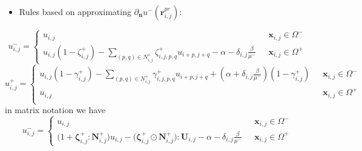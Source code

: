 \documentclass{elsarticle}
\begin{document}
\begin{itemize}
\item Rules based on approximating $\partial_\mathbf{n}u^-(\mathbf{r}^{pr}_{i,j})$:
\end{itemize}
\begin{equation}
 u_{i,j}^-=\begin{cases}
    u_{i,j} & \text{ $\mathbf{x}_{i,j}\in \Omega^-$}\\
    u_{i,j} (1-\zeta^+_{i,j}) - \sum_{(p,q)\in N_{i,j}^+} \zeta_{i,j,p,q}^+ u_{i+p,j+q} - \alpha - \delta_{i,j}\frac{\beta}{\mu^-} & \text{ $\mathbf{x}_{i,j}\in \Omega^+$}
  \end{cases}
\end{equation}
\begin{equation}
 u_{i,j}^+=\begin{cases}
    u_{i,j}(1 - \gamma^+_{i,j}) - \sum_{(p,q)\in N^+_{i,j}} \gamma^+_{i,j,p,q} u_{i+p, j+q} + (\alpha + \delta_{i,j}\frac{\beta}{\mu^-})(1 - \gamma^+_{i,j})  & \text{ $\mathbf{x}_{i,j}\in \Omega^-$} \\
    u_{i,j} & \text{ $\mathbf{x}_{i,j}\in \Omega^+$}\\
  \end{cases}
\end{equation}
in matrix notation we have
\begin{equation}
 u_{i,j}^-=\begin{cases}
    u_{i,j} & \text{ $\mathbf{x}_{i,j}\in \Omega^-$}\\
    \big(1 + \boldsymbol{\zeta}^+_{i,j} : \mathbf{N}^+_{i,j}\big) u_{i,j}  -  \big( \boldsymbol{\zeta}^+_{i,j} \odot \mathbf{N}^+_{i,j} \big) : \mathbf{U}_{i,j} - \alpha - \delta_{i,j}\frac{\beta}{\mu^-} & \text{ $\mathbf{x}_{i,j}\in \Omega^+$}
  \end{cases}
\end{equation}
\end{document}
